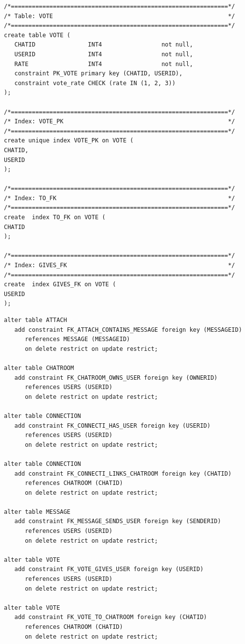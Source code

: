 \documentclass[a4paper, 12pt]{article}
\begin{document}
\cleardoublepage
\begin{verbatim}
/*==============================================================*/
/* Table: VOTE                                                  */
/*==============================================================*/
create table VOTE (
   CHATID               INT4                 not null,
   USERID               INT4                 not null,
   RATE                 INT4                 not null,
   constraint PK_VOTE primary key (CHATID, USERID),
   constraint vote_rate CHECK (rate IN (1, 2, 3))
);

/*==============================================================*/
/* Index: VOTE_PK                                               */
/*==============================================================*/
create unique index VOTE_PK on VOTE (
CHATID,
USERID
);

/*==============================================================*/
/* Index: TO_FK                                                 */
/*==============================================================*/
create  index TO_FK on VOTE (
CHATID
);

/*==============================================================*/
/* Index: GIVES_FK                                              */
/*==============================================================*/
create  index GIVES_FK on VOTE (
USERID
);
\end{verbatim}
\cleardoublepage
\begin{verbatim}
alter table ATTACH
   add constraint FK_ATTACH_CONTAINS_MESSAGE foreign key (MESSAGEID)
      references MESSAGE (MESSAGEID)
      on delete restrict on update restrict;

alter table CHATROOM
   add constraint FK_CHATROOM_OWNS_USER foreign key (OWNERID)
      references USERS (USERID)
      on delete restrict on update restrict;

alter table CONNECTION
   add constraint FK_CONNECTI_HAS_USER foreign key (USERID)
      references USERS (USERID)
      on delete restrict on update restrict;

alter table CONNECTION
   add constraint FK_CONNECTI_LINKS_CHATROOM foreign key (CHATID)
      references CHATROOM (CHATID)
      on delete restrict on update restrict;

alter table MESSAGE
   add constraint FK_MESSAGE_SENDS_USER foreign key (SENDERID)
      references USERS (USERID)
      on delete restrict on update restrict;

alter table VOTE
   add constraint FK_VOTE_GIVES_USER foreign key (USERID)
      references USERS (USERID)
      on delete restrict on update restrict;

alter table VOTE
   add constraint FK_VOTE_TO_CHATROOM foreign key (CHATID)
      references CHATROOM (CHATID)
      on delete restrict on update restrict;
\end{verbatim}
\cleardoublepage
\end{document}
